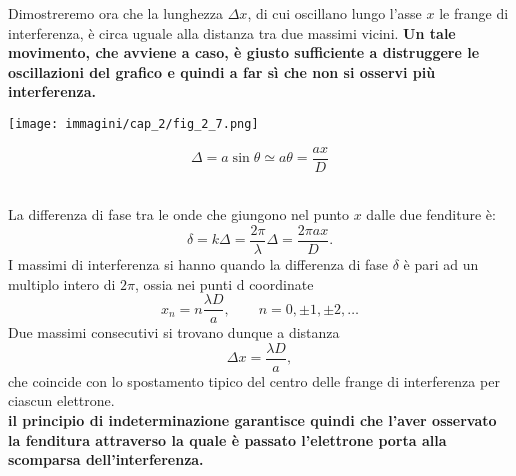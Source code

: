 Dimostreremo ora che la lunghezza $\Delta x$, di cui oscillano lungo l'asse $x$ le frange di interferenza, è circa uguale alla distanza tra due massimi vicini. \textbf{Un tale movimento, che avviene a caso, è giusto sufficiente a distruggere le oscillazioni del grafico e quindi a far sì che non si osservi più interferenza.}\\
\vspace{1cm}
\begin{minipage}{.5\textwidth}
\texttt{[image: immagini/cap\_2/fig\_2\_7.png]}	
\end{minipage}
\begin{minipage}{.5\textwidth}
\begin{equation}
\Delta = a \sin \theta \simeq a \theta = \frac{ax}{D}
\end{equation}
\end{minipage}\\
\vspace{.5cm}
La differenza di fase tra le onde che giungono nel punto $x$ dalle due fenditure è:
	\begin{equation}
		\delta = k\Delta =\frac{2 \pi }{\lambda}\Delta = \frac{2 \pi a x}{D}.
	\end{equation}
I massimi di interferenza si hanno quando la differenza di fase $\delta $ è pari ad un multiplo intero di $2 \pi$, ossia nei punti d coordinate
	\begin{equation}
		x_n =n\frac{\lambda D}{a}, \qquad n=0,\pm 1, \pm 2, \dots 
	\end{equation}
Due massimi consecutivi si trovano dunque a distanza 
	\begin{equation}
		\boxed{
			\Delta x = \frac{\lambda D}{a},
			}
	\end{equation}
che coincide con lo spostamento tipico del centro delle frange di interferenza per ciascun elettrone.\\

\textbf{il principio di indeterminazione garantisce quindi che l'aver osservato la fenditura attraverso la quale è passato l'elettrone porta alla scomparsa dell'interferenza.}
